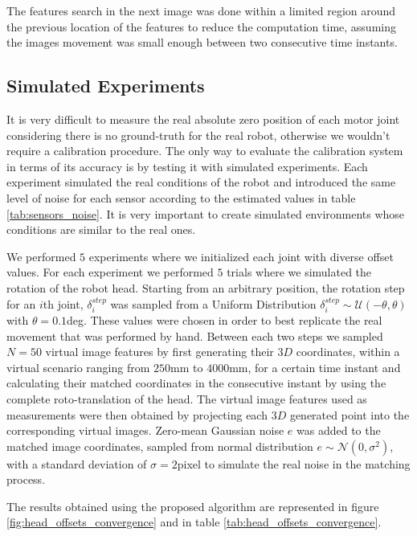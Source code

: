 The features search in the next image was done within a limited region around the previous location of the features to reduce the computation time, assuming the images movement was small enough between two consecutive time instants.

\subsection{Simulated Experiments}\label{sec:simulated_experiments}

It is very difficult to measure the real absolute zero position of each motor joint considering there is no ground-truth for the real robot, otherwise we wouldn't require a calibration procedure. The only way to evaluate the calibration system in terms of its accuracy is by testing it with simulated experiments. Each experiment simulated the real conditions of the robot and introduced the same level of noise for each sensor according to the estimated values in table \ref{tab:sensors_noise}. It is very important to create simulated environments whose conditions are similar to the real ones.

We performed $5$ experiments where we initialized each joint with diverse offset values. For each experiment we performed $5$ trials where we simulated the rotation of the robot head. Starting from an arbitrary position, the rotation step for an $i$th joint, $\delta_i^{step}$ was sampled from a Uniform Distribution $\delta_i^{step}\sim\mathcal{U}\left(-\theta,\theta\right)$ with $\theta=0.1$deg. These values were chosen in order to best replicate the real movement that was performed by hand. Between each two steps we sampled $N=50$ virtual image features by first generating their $3D$ coordinates, within a virtual scenario ranging from $250$mm to $4000$mm, for a certain time instant and calculating their matched coordinates in the consecutive instant by using the complete roto-translation of the head. The virtual image features used as measurements were then obtained by projecting each $3D$ generated point into the corresponding virtual images. Zero-mean Gaussian noise $e$ was added to the matched image coordinates, sampled from normal distribution $e\sim\mathcal{N}\left(0,\sigma^{2}\right)$, with a standard deviation of $\sigma=2$pixel to simulate the real noise in the matching process.

The results obtained using the proposed algorithm are represented in figure \ref{fig:head_offsets_convergence} and in table \ref{tab:head_offsets_convergence}.


